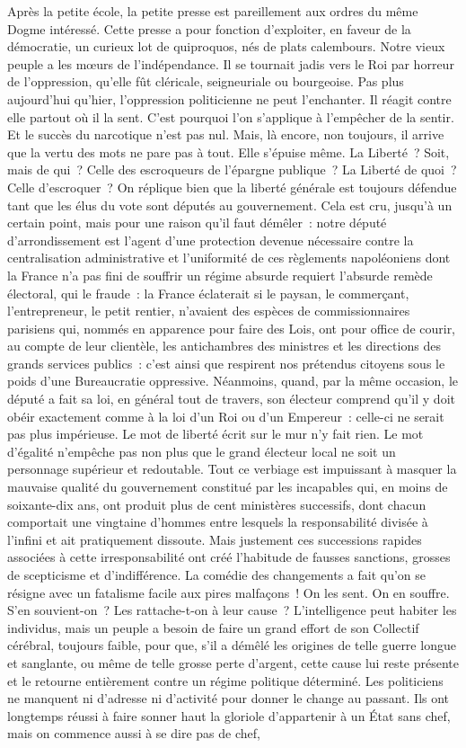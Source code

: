 \documentclass[french,twoside]{book} %
\begin{document}
Après la petite école, la petite presse est pareillement aux ordres du même Dogme intéressé. Cette presse a pour fonction d’exploiter, en faveur de la démocratie, un curieux lot de quiproquos, nés de plats calembours. Notre vieux peuple a les mœurs de l’indépendance. Il se tournait jadis vers le Roi par horreur de l’oppression, qu’elle fût cléricale, seigneuriale ou bourgeoise. Pas plus aujourd’hui qu’hier, l’oppression politicienne ne peut l’enchanter. Il réagit contre elle partout où il la sent. C’est pourquoi l’on s’applique à l’empêcher de la sentir. Et le succès du narcotique n’est pas nul. Mais, là encore, non toujours, il arrive que la vertu des mots ne pare pas à tout. Elle s’épuise même. La Liberté ? Soit, mais de qui ? Celle des escroqueurs de l’épargne publique ? La Liberté de quoi ? Celle d’escroquer ? On réplique bien que la liberté générale est toujours défendue tant que les élus du vote sont députés au gouvernement. Cela est cru, jusqu’à un certain point, mais pour une raison qu’il faut démêler : notre député d’arrondissement est l’agent d’une protection devenue nécessaire contre la centralisation administrative et l’uniformité de ces règlements napoléoniens dont la France n’a pas fini de souffrir un régime absurde requiert l’absurde remède électoral, qui le fraude : la France éclaterait si le paysan, le commerçant, l’entrepreneur, le petit rentier, n’avaient des espèces de commissionnaires parisiens qui, nommés en apparence pour faire des Lois, ont pour office de courir, au compte de leur clientèle, les antichambres des ministres et les directions des grands services publics : c’est ainsi que respirent nos prétendus citoyens sous le poids d’une Bureaucratie oppressive. Néanmoins, quand, par la même occasion, le député a fait sa loi, en général tout de travers, son électeur comprend qu’il y doit obéir exactement comme à la loi d’un Roi ou d’un Empereur : celle-ci ne serait pas plus impérieuse. Le mot de liberté écrit sur le mur n’y fait rien. Le mot d’égalité n’empêche pas non plus que le grand électeur local ne soit un personnage supérieur et redoutable. Tout ce verbiage est impuissant à masquer la mauvaise qualité du gouvernement constitué par les incapables qui, en moins de soixante-dix ans, ont produit plus de cent ministères successifs, dont chacun comportait une vingtaine d’hommes entre lesquels la responsabilité divisée à l’infini et ait pratiquement dissoute. Mais justement ces successions rapides associées à cette irresponsabilité ont créé l’habitude de fausses sanctions, grosses de scepticisme et d’indifférence. La comédie des changements a fait qu’on se résigne avec un fatalisme facile aux pires malfaçons ! On les sent. On en souffre. S’en souvient-on ? Les rattache-t-on à leur cause ? L’intelligence peut habiter les individus, mais un peuple a besoin de faire un grand effort de son Collectif cérébral, toujours faible, pour que, s’il a démêlé les origines de telle guerre longue et sanglante, ou même de telle grosse perte d’argent, cette cause lui reste présente et le retourne entièrement contre un régime politique déterminé. Les politiciens ne manquent ni d’adresse ni d’activité pour donner le change au passant. Ils ont longtemps réussi à faire sonner haut la gloriole d’appartenir à un État sans chef, mais on commence aussi à se dire pas de chef, 
\end{document}
